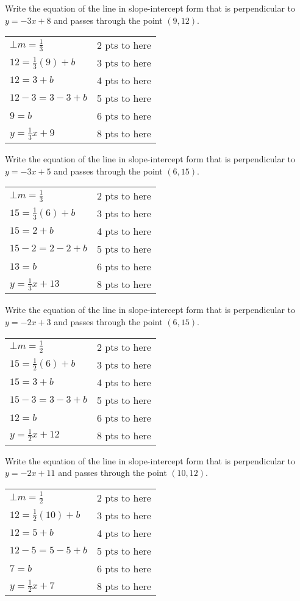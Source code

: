 {
	Write the equation of the line in slope-intercept form that is perpendicular to $y=-3x+8$ and passes through the point $(9,12)$.
}
{
	\begin{tabular}{l r}
	$\bot m=\frac{1}{3}$ & 2 pts to here\\
	$12=\frac{1}{3}(9)+b$ & 3 pts to here\\
	$12=3+b$ & 4 pts to here\\
	$12-3=3-3+b$ & 5 pts to here\\
	$9=b$ & 6 pts to here\\
	$y=\frac{1}{3}x+9$ & 8 pts to here
	\end{tabular}
}

{
	Write the equation of the line in slope-intercept form that is perpendicular to $y=-3x+5$ and passes through the point $(6,15)$.
}
{
	\begin{tabular}{l r}
	$\bot m=\frac{1}{3}$ & 2 pts to here\\
	$15=\frac{1}{3}(6)+b$ & 3 pts to here\\
	$15=2+b$ & 4 pts to here\\
	$15-2=2-2+b$ & 5 pts to here\\
	$13=b$ & 6 pts to here\\
	$y=\frac{1}{3}x+13$ & 8 pts to here
	\end{tabular}
}

{
	Write the equation of the line in slope-intercept form that is perpendicular to $y=-2x+3$ and passes through the point $(6,15)$.
}
{
	\begin{tabular}{l r}
	$\bot m=\frac{1}{2}$ & 2 pts to here\\
	$15=\frac{1}{2}(6)+b$ & 3 pts to here\\
	$15=3+b$ & 4 pts to here\\
	$15-3=3-3+b$ & 5 pts to here\\
	$12=b$ & 6 pts to here\\
	$y=\frac{1}{2}x+12$ & 8 pts to here
	\end{tabular}
}

{
	Write the equation of the line in slope-intercept form that is perpendicular to $y=-2x+11$ and passes through the point $(10,12)$.
}
{
	\begin{tabular}{l r}
	$\bot m=\frac{1}{2}$ & 2 pts to here\\
	$12=\frac{1}{2}(10)+b$ & 3 pts to here\\
	$12=5+b$ & 4 pts to here\\
	$12-5=5-5+b$ & 5 pts to here\\
	$7=b$ & 6 pts to here\\
	$y=\frac{1}{2}x+7$ & 8 pts to here
	\end{tabular}
}
